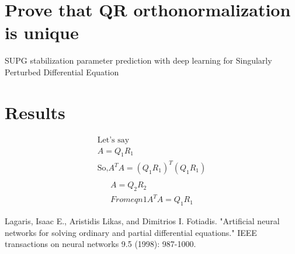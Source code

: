 \documentclass[]{article}
\title{}
\author{Sangeeta Yadav}
\begin{document}
\maketitle
\section{Prove that QR orthonormalization is unique}
SUPG stabilization parameter prediction with deep learning for Singularly Perturbed Differential Equation 


\section{Results}

\begin{equation}
\begin{split}
\text{Let's say}\\ 
A = Q_1 R_1 \\
\text{So,} A^T A = (Q_1 R_1)^T (Q_1 R_1)\\ 
\end{split}
\end{equation}
\begin{equation}
\begin{split}
A = Q_2 R_2 \\ 
From eqn 1 
A^T A = Q_1 R_1 
\end{split}
\end{equation}



\begin{thebibliography}{00}
	 Lagaris, Isaac E., Aristidis Likas, and Dimitrios I. Fotiadis. "Artificial neural networks for solving ordinary and partial differential equations." IEEE transactions on neural networks 9.5 (1998): 987-1000.
	

\end{thebibliography}
\end{document}
